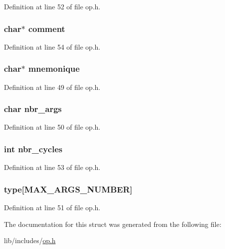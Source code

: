 Definition at line 52 of file op.\-h.

\hypertarget{structop__s_a25dae25c3bf9b28d54eb4df7afb2a491}{
\subsubsection[{comment}]{\setlength{\rightskip}{0pt plus 5cm}char$\ast$ comment}}\label{structop__s_a25dae25c3bf9b28d54eb4df7afb2a491}


Definition at line 54 of file op.\-h.

\hypertarget{structop__s_a814bd20fa5dd2cbf82039374f08c0aa0}{
\subsubsection[{mnemonique}]{\setlength{\rightskip}{0pt plus 5cm}char$\ast$ mnemonique}}\label{structop__s_a814bd20fa5dd2cbf82039374f08c0aa0}


Definition at line 49 of file op.\-h.

\hypertarget{structop__s_aca9388e05ed27c0837deb9e4320a3bb3}{
\subsubsection[{nbr\-\_\-args}]{\setlength{\rightskip}{0pt plus 5cm}char nbr\-\_\-args}}\label{structop__s_aca9388e05ed27c0837deb9e4320a3bb3}


Definition at line 50 of file op.\-h.

\hypertarget{structop__s_a0b18918052dbe752738c906b8c285cfb}{
\subsubsection[{nbr\-\_\-cycles}]{\setlength{\rightskip}{0pt plus 5cm}int nbr\-\_\-cycles}}\label{structop__s_a0b18918052dbe752738c906b8c285cfb}


Definition at line 53 of file op.\-h.

\hypertarget{structop__s_a7fb3bacccb9ce7408a05193c7457a21d}{
\subsubsection[{type}]{ type\mbox{[}{\bf M\-A\-X\-\_\-\-A\-R\-G\-S\-\_\-\-N\-U\-M\-B\-E\-R}\mbox{]}}}\label{structop__s_a7fb3bacccb9ce7408a05193c7457a21d}


Definition at line 51 of file op.\-h.



The documentation for this struct was generated from the following file\-:\begin{DoxyCompactItemize}
\item 
lib/includes/\hyperlink{op_8h}{op.\-h}\end{DoxyCompactItemize}
